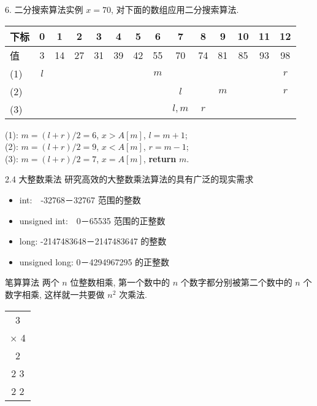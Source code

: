 \documentclass[fontset=fandol,UTF8,fleqn]{beamer}
\begin{document}
\begin{frame}{6. 二分搜索算法实例}
  $x=70$, 对下面的数组应用二分搜索算法.
  \begin{table}[!htbp]
    \centering
\begin{tabular}{lccccccccccccc}
      下标 & 0 & 1 & 2 & 3 & 4 & 5 & 6 & 7 & 8 & 9 & 10 & 11 & 12\\
\hline
值  & 3  & 14 & 27 & 31 & 39 & 42 & 55 & 70 & 74 & 81 & 85 & 93 & 98\\
\hline
(1) & $l$ & & & & & & $m$ & & & & & & $r$\\
(2) &     & & & & & &     & $l$ & & $m$ & & & $r$ \\
(3)  &     & & & & & &     & $l,m$ & $r$ &  & & &    \\

      \hline 
      \end{tabular}
  \end{table}
(1): $m = (l+r)/2 = 6$, $x> A[m]$, $l = m+1$;  \\
(2): $m= (l+r)/2 = 9$, $x < A[m]$,  $r = m-1$;  \\
(3): $m = (l+r)/2 = 7$, $x=A[m]$, \textbf{return} $m$.
\end{frame}

\begin{frame}{2.4 大整数乘法}
研究高效的大整数乘法算法的具有广泛的现实需求
\begin{itemize}[<+-|alert@+>]
\item \textsf{int}:　-32768－32767 范围的整数 
\item \textsf{unsigned int}:　0－65535 范围的正整数  
\item \textsf{long}: -2147483648－2147483647 的整数  
\item \textsf{unsigned long}: 0－4294967295 的正整数 
\end{itemize}
\end{frame}

\begin{frame}{笔算算法}
两个
$n$ 位整数相乘, 第一个数中的 $n$ 个数字都分别被第二个数中的 $n$ 个数字相乘, 这样就一共要做 $n^2$ 次乘法.  
\begin{table}
\centering
\begin{tabular}{c}
\qquad  2 3 \\
$\times$ \quad 1 4\\
\hline
\qquad 9 2\\
 2 3\\
\hline
\quad 3 2 2  
\end{tabular}
\end{table}
\end{frame}
\end{document}

